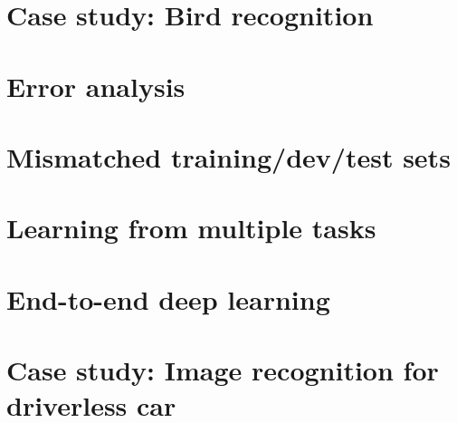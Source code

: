 \documentclass[12pt, a4paper]{article}
\numberwithin{equation}{section}
\begin{document}
\section{Case study: Bird recognition}


\section{Error analysis}


\section{Mismatched training/dev/test sets}


\section{Learning from multiple tasks}


\section{End-to-end deep learning}


\section{Case study: Image recognition for driverless car}
\end{document}
